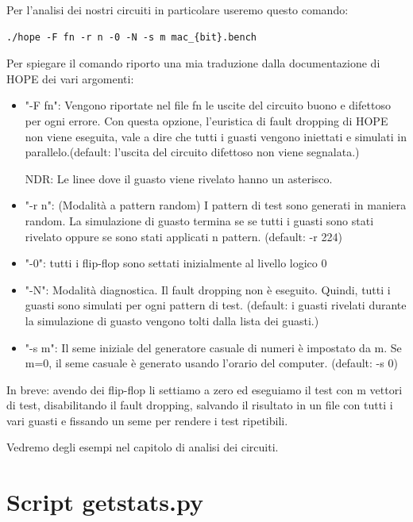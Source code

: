 \documentclass[12pt, letterpaper]{article}
\begin{document}
Per l'analisi dei nostri circuiti in particolare useremo questo comando: 

\begin{lstlisting}
./hope -F fn -r n -0 -N -s m mac_{bit}.bench
\end{lstlisting}

Per spiegare il comando riporto una mia traduzione dalla documentazione di HOPE dei vari argomenti:

\begin{itemize}
\item "-F fn": Vengono riportate nel file fn le uscite del circuito buono e difettoso per ogni errore. Con questa opzione, l'euristica di fault dropping di HOPE non viene eseguita, vale a dire che tutti i guasti vengono iniettati e simulati in parallelo.(default: l'uscita del circuito difettoso non viene segnalata.) 

NDR: Le linee dove il guasto viene rivelato hanno un asterisco.

\item "-r n": (Modalità a pattern random)
I pattern di test sono generati in maniera random. La simulazione di guasto termina se se tutti i guasti sono stati rivelato oppure se sono stati applicati n pattern. (default: -r 224)

\item "-0": tutti i flip-flop sono settati inizialmente al livello logico 0

\item "-N": Modalità diagnostica. Il fault dropping non è eseguito. Quindi, tutti i guasti sono simulati per ogni pattern di test. (default: i guasti rivelati durante la simulazione di guasto vengono tolti dalla lista dei guasti.)

\item "-s m": Il seme iniziale del generatore casuale di numeri è impostato da m.
Se m=0, il seme casuale è generato usando l'orario del computer. (default: -s 0)

\end{itemize}

In breve: avendo dei flip-flop li settiamo a zero ed eseguiamo il test con m vettori di test, disabilitando il fault dropping, salvando il risultato in un file con tutti i vari guasti e fissando un seme per rendere i test ripetibili.

Vedremo degli esempi nel capitolo di analisi dei circuiti.

\section{Script getstats.py}
\end{document}
